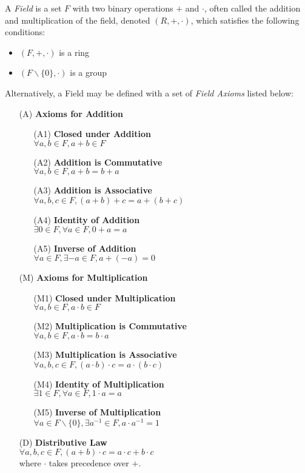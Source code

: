 \documentclass{report}
\begin{document}
		\begin{defn}[Field] \label{def_field}
			A \emph{Field} is a set $F$ with two binary operations $+$ and $\cdot$, often called the addition and multiplication of the field, denoted $(R,+,\cdot)$, which satisfies the following conditions:
			\begin{itemize}
				\item $(F,+,\cdot)$ is a ring
				\item $(F\backslash \{0\},\cdot)$ is a group
			\end{itemize}
			Alternatively, a Field may be defined with a set of \emph{Field Axioms} listed below:
			\begin{itemize}
					\item[(A)] \textbf{Axioms for Addition}
					\begin{itemize}
						\item[(A1)] \textbf{Closed under Addition}\\$\forall a,b \in F, a+b \in F$
						\item[(A2)] \textbf{Addition is Commutative}\\$\forall a,b \in F, a+b=b+a$
						\item[(A3)] \textbf{Addition is Associative}\\$\forall a,b,c \in F, (a+b)+c=a+(b+c)$
						\item[(A4)] \textbf{Identity of Addition}\\$\exists 0 \in F, \forall a \in F, 0+a=a$
						\item[(A5)] \textbf{Inverse of Addition}\\$\forall a \in F, \exists -a \in F, a+(-a)=0$
					\end{itemize}
					\item[(M)] \textbf{Axioms for Multiplication}
					\begin{itemize}
						\item[(M1)] \textbf{Closed under Multiplication}\\$\forall a,b \in F, a \cdot b \in F$
						\item[(M2)] \textbf{Multiplication is Commutative}\\$\forall a,b \in F, a \cdot b=b \cdot a$
						\item[(M3)] \textbf{Multiplication is Associative}\\$\forall a,b,c \in F, (a \cdot b) \cdot c=a \cdot (b \cdot c)$
						\item[(M4)] \textbf{Identity of Multiplication}\\$\exists 1 \in F, \forall a \in F, 1 \cdot a=a$
						\item[(M5)] \textbf{Inverse of Multiplication}\\$\forall a \in F\backslash\{0\}, \exists a^{-1} \in F, a \cdot a^{-1}=1$
					\end{itemize}
				\item[(D)] \textbf{Distributive Law}
				\\$\forall a,b,c \in F, (a+b) \cdot c=a \cdot c+b \cdot c$\\where $\cdot$ takes precedence over $+$.
			\end{itemize}
		\end{defn}
\end{document}
